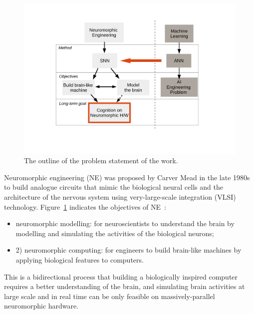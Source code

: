 \begin{figure}[tbh!]
	\centering
	\includegraphics[width=1.0\textwidth]{pics_intro/intro2.pdf}
	\caption{
		The outline of the problem statement of the work.
		}
	\label{fig:intro}
\end{figure}
Neuromorphic engineering (NE) was proposed by Carver Mead in the late 1980s \cite{Mead:1989:AVN:64998} to build analogue circuits that mimic the biological neural cells and the architecture of the nervous system using very-large-scale integration (VLSI) technology.
Figure~\ref{fig:intro} indicates the objectives of NE~\cite{furber2007neural}:
\begin{itemize}
	\item neuromorphic modelling: for neuroscientists to understand the brain by modelling and simulating the activities of the biological neurons; 
	\item 2) neuromorphic computing: for engineers to build brain-like machines by applying biological features to computers.
\end{itemize}
This is a bidirectional process that building a biologically inspired computer requires a better understanding of the brain, and simulating brain activities at large scale and in real time can be only feasible on massively-parallel neuromorphic hardware.

